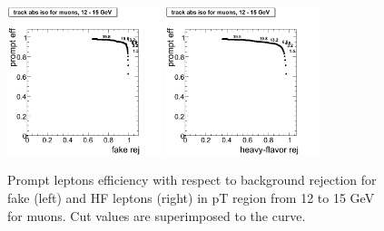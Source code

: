 \begin{figure}[htbp]
\begin{center}
 \includegraphics[width = 0.4\textwidth]{pictures/bkgdRej_sigEff/onlyTrack_muon_fake_ptCut3_ptCut4.png}
\includegraphics[width = 0.4\textwidth]{pictures/bkgdRej_sigEff/onlyTrack_muon_nonPrompt_ptCut3_ptCut4.png}
\caption{\small{Prompt leptons efficiency with respect to background 
rejection for fake (left) and HF leptons (right) in pT region
from 12 to 15 GeV for muons. 
Cut values are superimposed to the curve.}\label{fig:rej_mu4}}
\end{center}
\end{figure}

